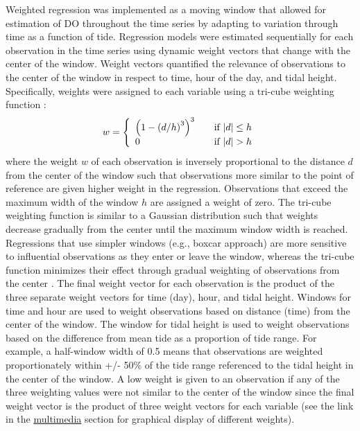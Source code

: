 \documentclass[letterpaper,12pt,oneside]{article}\usepackage[]{graphicx}\usepackage[]{color}
\begin{document}
Weighted regression was implemented as a moving window that allowed for estimation of \ac{DO} throughout the time series by adapting to variation through time as a function of tide. Regression models were estimated sequentially for each observation in the time series using dynamic weight vectors that change with the center of the window.  Weight vectors quantified the relevance of observations to the center of the window in respect to time, hour of the day, and tidal height.  Specifically, weights were assigned to each variable using a tri-cube weighting function \citep{Tukey77,Hirsch10}:
\begin{equation}
w= \left\{ 
  \begin{array}{l l}
    \left(1-\left(d/h\right)^3\right)^3 & \quad \textrm{if } |d| \leq h \\
    0 & \quad \textrm{if } |d| > h 
  \end{array} \right.
\end{equation}
where the weight $w$ of each observation is inversely proportional to the distance $d$ from the center of the window such that observations more similar to the point of reference are given higher weight in the regression.  Observations that exceed the maximum width of the window $h$ are assigned a weight of zero.  The tri-cube weighting function is similar to a Gaussian distribution such that weights decrease gradually from the center until the maximum window width is reached.  Regressions that use simpler windows (e.g., boxcar approach) are  more sensitive to influential observations as they enter or leave the window, whereas the tri-cube function minimizes their effect through gradual weighting of observations from the center \citep{Hirsch10}.  The final weight vector for each observation is the product of the three separate weight vectors for time (day), hour, and tidal height. Windows for time and hour are used to weight observations based on distance (time) from the center of the window.  The window for tidal height is used to weight observations based on the difference from mean tide as a proportion of tide range.  For example, a half-window width of 0.5 means that observations are weighted proportionately within +/- 50\% of the tide range referenced to the tidal height in the center of the window. A low weight is given to an observation if any of the three weighting values were not similar to the center of the window since the final weight vector is the product of three weight vectors for each variable (see the link in the \hyperref[multi]{multimedia} section for graphical display of different weights).    
\end{document}
